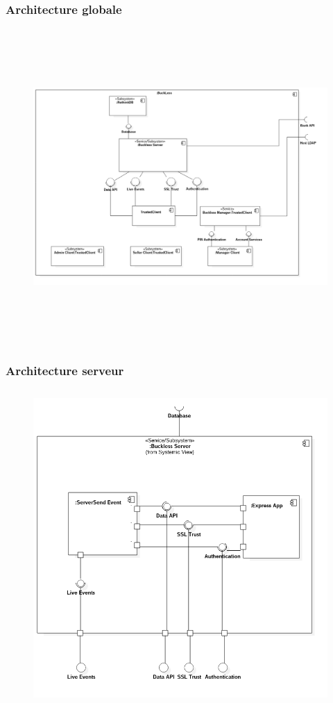     \subsubsection{Architecture globale}
        \begin{figure}[h]
            \centering
            \includegraphics[height=12cm]{./assets/UML/system.png}
        \end{figure}

    \newpage
    \subsubsection{Architecture serveur}
        \begin{figure}[h]
            \centering
            \includegraphics[height=12cm]{./assets/UML/buckless_server.png}
        \end{figure}

